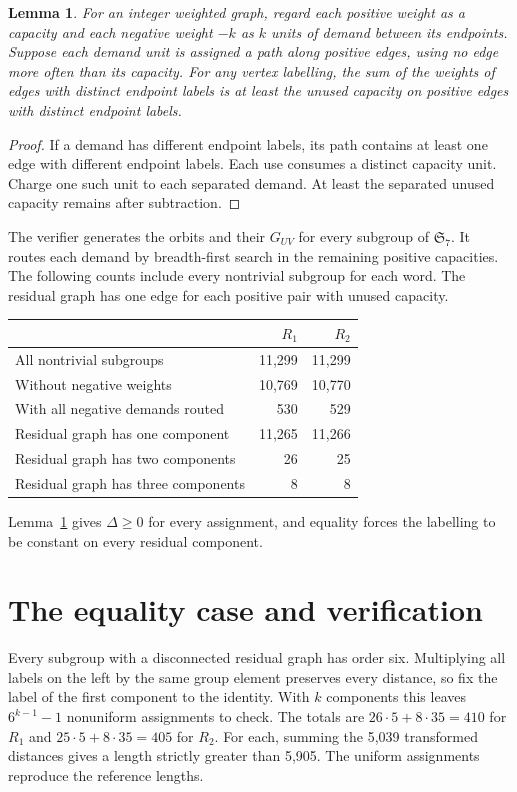 \documentclass[11pt]{article}
\newtheorem{lemma}[theorem]{Lemma}
\newcommand{\Sym}{\mathfrak S_7}
\begin{document}
\begin{lemma}\label{lem:route}
For an integer weighted graph, regard each positive weight as a capacity and each negative weight $-k$ as $k$ units of demand between its endpoints. Suppose each demand unit is assigned a path along positive edges, using no edge more often than its capacity. For any vertex labelling, the sum of the weights of edges with distinct endpoint labels is at least the unused capacity on positive edges with distinct endpoint labels.
\end{lemma}
\begin{proof}
If a demand has different endpoint labels, its path contains at least one edge with different endpoint labels. Each use consumes a distinct capacity unit. Charge one such unit to each separated demand. At least the separated unused capacity remains after subtraction.
\end{proof}

The verifier generates the orbits and their $G_{UV}$ for every subgroup of $\Sym$. It routes each demand by breadth-first search in the remaining positive capacities. The following counts include every nontrivial subgroup for each word. The residual graph has one edge for each positive pair with unused capacity.
\begin{center}
\begin{tabular}{lrr}
\toprule
 & $R_1$ & $R_2$\\
\midrule
All nontrivial subgroups &11,299&11,299\\
Without negative weights &10,769&10,770\\
With all negative demands routed &530&529\\
Residual graph has one component &11,265&11,266\\
Residual graph has two components &26&25\\
Residual graph has three components &8&8\\
\bottomrule
\end{tabular}
\end{center}
Lemma~\ref{lem:route} gives $\Delta\geq0$ for every assignment, and equality forces the labelling to be constant on every residual component.
\newpage
\section{The equality case and verification}
Every subgroup with a disconnected residual graph has order six. Multiplying all labels on the left by the same group element preserves every distance, so fix the label of the first component to the identity. With $k$ components this leaves $6^{k-1}-1$ nonuniform assignments to check. The totals are $26\cdot5+8\cdot35=410$ for $R_1$ and $25\cdot5+8\cdot35=405$ for $R_2$. For each, summing the 5,039 transformed distances gives a length strictly greater than 5,905. The uniform assignments reproduce the reference lengths.
\end{document}
